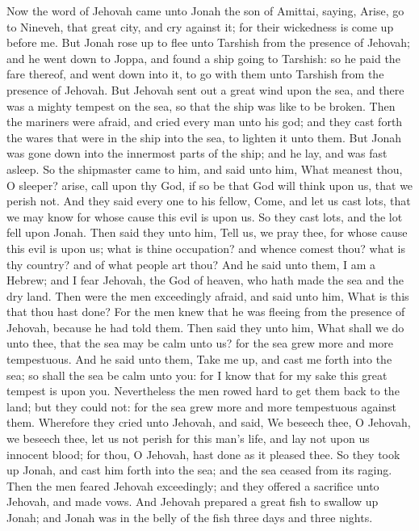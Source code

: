 


Now the word of Jehovah came unto Jonah the son of Amittai, saying, Arise, go to Nineveh, that great city, and cry against it; for their wickedness is come up before me. But Jonah rose up to flee unto Tarshish from the presence of Jehovah; and he went down to Joppa, and found a ship going to Tarshish: so he paid the fare thereof, and went down into it, to go with them unto Tarshish from the presence of Jehovah.  But Jehovah sent out a great wind upon the sea, and there was a mighty tempest on the sea, so that the ship was like to be broken. Then the mariners were afraid, and cried every man unto his god; and they cast forth the wares that were in the ship into the sea, to lighten it unto them. But Jonah was gone down into the innermost parts of the ship; and he lay, and was fast asleep. So the shipmaster came to him, and said unto him, What meanest thou, O sleeper? arise, call upon thy God, if so be that God will think upon us, that we perish not. And they said every one to his fellow, Come, and let us cast lots, that we may know for whose cause this evil is upon us. So they cast lots, and the lot fell upon Jonah. Then said they unto him, Tell us, we pray thee, for whose cause this evil is upon us; what is thine occupation? and whence comest thou? what is thy country? and of what people art thou? And he said unto them, I am a Hebrew; and I fear Jehovah, the God of heaven, who hath made the sea and the dry land. Then were the men exceedingly afraid, and said unto him, What is this that thou hast done? For the men knew that he was fleeing from the presence of Jehovah, because he had told them.  Then said they unto him, What shall we do unto thee, that the sea may be calm unto us? for the sea grew more and more tempestuous. And he said unto them, Take me up, and cast me forth into the sea; so shall the sea be calm unto you: for I know that for my sake this great tempest is upon you. Nevertheless the men rowed hard to get them back to the land; but they could not: for the sea grew more and more tempestuous against them. Wherefore they cried unto Jehovah, and said, We beseech thee, O Jehovah, we beseech thee, let us not perish for this man’s life, and lay not upon us innocent blood; for thou, O Jehovah, hast done as it pleased thee. So they took up Jonah, and cast him forth into the sea; and the sea ceased from its raging. Then the men feared Jehovah exceedingly; and they offered a sacrifice unto Jehovah, and made vows.  And Jehovah prepared a great fish to swallow up Jonah; and Jonah was in the belly of the fish three days and three nights. 

